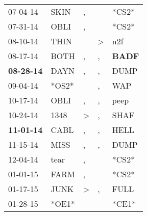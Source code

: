 \begin{supertabular}{p{0.07\textwidth}p{0.06\textwidth}p{0.02\textwidth}p{0.02\textwidth}p{0.06\textwidth}}
          07-04-14\textsuperscript{} &           SKIN\textsuperscript{} &                , &                  &                            *CS2* \\
          07-31-14\textsuperscript{} &           OBLI\textsuperscript{} &                , &                  &                            *CS2* \\
          08-10-14\textsuperscript{} &           THIN\textsuperscript{} &                  &     \textgreater &            n2f\textsuperscript{} \\
          08-17-14\textsuperscript{} &           BOTH\textsuperscript{} &                , &                , &  \textbf{BADF\textsuperscript{}} \\
 \textbf{08-28-14\textsuperscript{}} &           DAYN\textsuperscript{} &                , &                , &           DUMP\textsuperscript{} \\
          09-04-14\textsuperscript{} &                            *OS2* &                  &                , &            WAP\textsuperscript{} \\
          10-17-14\textsuperscript{} &           OBLI\textsuperscript{} &                , &                , &           peep\textsuperscript{} \\
          10-24-14\textsuperscript{} &           1348\textsuperscript{} &     \textgreater &                , &           SHAF\textsuperscript{} \\
 \textbf{11-01-14\textsuperscript{}} &           CABL\textsuperscript{} &                , &                , &           HELL\textsuperscript{} \\
          11-15-14\textsuperscript{} &           MISS\textsuperscript{} &                , &                , &           DUMP\textsuperscript{} \\
          12-04-14\textsuperscript{} &           tear\textsuperscript{} &                , &                  &                            *CS2* \\
          01-01-15\textsuperscript{} &           FARM\textsuperscript{} &                , &                  &                            *CS2* \\
          01-17-15\textsuperscript{} &           JUNK\textsuperscript{} &     \textgreater &                , &           FULL\textsuperscript{} \\
          01-28-15\textsuperscript{} &                            *OE1* &                  &                  &                            *CE1* \\

\end{supertabular}

